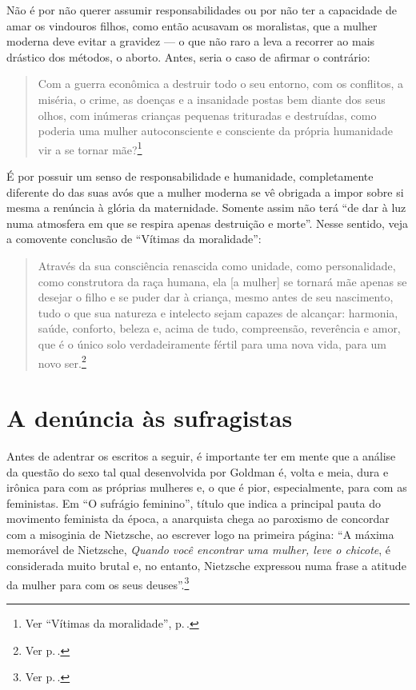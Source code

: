 Não é por não
querer assumir responsabilidades ou por não ter a capacidade de amar os
vindouros filhos, como então acusavam os moralistas, que a mulher
moderna deve evitar a gravidez --- o que não raro a leva a
recorrer ao mais drástico dos métodos, o aborto. Antes, seria o caso de
afirmar o contrário:

\begin{quote}
Com a guerra econômica a destruir todo o seu entorno, com os conflitos,
a miséria, o crime, as doenças e a insanidade postas bem diante dos seus
olhos, com inúmeras crianças pequenas trituradas e destruídas, como
poderia uma mulher autoconsciente e consciente da própria humanidade vir
a se tornar mãe?\footnote{Ver ``Vítimas da moralidade'', p.\,\pageref{entorno}.}
\end{quote}
 
É por possuir um senso de
responsabilidade e humanidade, completamente diferente do das suas avós
que a mulher moderna se vê obrigada a impor sobre si mesma a renúncia à
glória da maternidade. Somente assim não terá ``de dar à luz numa
atmosfera em que se respira apenas destruição e morte''. Nesse
sentido, veja a comovente conclusão de ``Vítimas da moralidade'':

\begin{quote}
Através da sua consciência renascida como unidade, como personalidade,
como construtora da raça humana, ela {[}a mulher{]} se tornará mãe apenas se desejar o
filho e se puder dar à criança, mesmo antes de seu nascimento, tudo o
que sua natureza e intelecto sejam capazes de alcançar: harmonia, saúde,
conforto, beleza e, acima de tudo, compreensão, reverência e amor, que é
o único solo verdadeiramente fértil para uma nova vida, para um novo
ser.\footnote{Ver p.\,\pageref{renascida}.}
\end{quote}

\section{A denúncia às sufragistas}

Antes de adentrar os escritos a seguir, é importante ter em mente que a
análise da questão do sexo tal qual desenvolvida por Goldman é,
volta e meia, dura e irônica para com as próprias mulheres e, o que é
pior, especialmente, para com as feministas. Em ``O sufrágio feminino'',
título que indica a principal pauta do movimento feminista da época, a
anarquista chega ao paroxismo de concordar com a misoginia de Nietzsche,
ao escrever logo na primeira página: ``A máxima memorável de Nietzsche, \textit{Quando você encontrar uma mulher, leve o chicote}, é considerada muito brutal e, no entanto, Nietzsche
expressou numa frase a atitude da mulher para com os seus deuses''.\footnote{Ver p.\,\pageref{herege}.}

